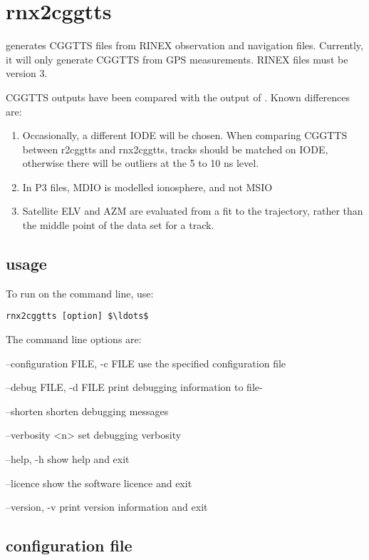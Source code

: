 \section{rnx2cggtts \label{s:rnx2cggtts}}

 generates CGGTTS files from RINEX observation and navigation files.
Currently, it will only generate CGGTTS from GPS measurements. RINEX files must be version 3.

CGGTTS outputs have been compared with the output of .
Known differences are:
\begin{enumerate}
\item Occasionally, a different IODE will be chosen. When comparing CGGTTS between r2cggtts and rnx2cggtts, 
tracks should be matched on IODE, otherwise there will be outliers at the 5 to 10 ns level.
\item In P3 files, MDIO is modelled ionosphere, and not MSIO
\item Satellite ELV and AZM are evaluated from a fit to the trajectory, rather than the middle point of the data set for a track. 
\end{enumerate}

\subsection{usage}

To run  on the command line, use:
\begin{lstlisting}[mathescape=true]
rnx2cggtts [option] $\ldots$
\end{lstlisting}
The command line options are:
\begin{description*}
	\item[--configuration FILE, -c  FILE] use the specified configuration file
	\item[--debug FILE, -d FILE]	print debugging information to file-
	\item[--shorten] shorten debugging messages
	\item[--verbosity \textless{n}\textgreater ]  set debugging verbosity
	\item[--help, -h]	show help and exit
	\item[--licence] show the software licence and exit
	\item[--version, -v]	print version information and exit
\end{description*}

\subsection{configuration file}

